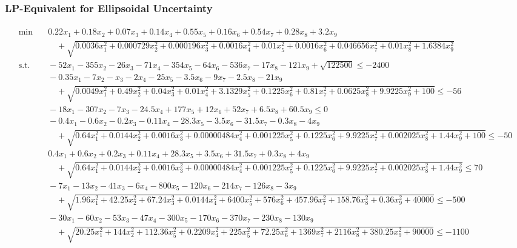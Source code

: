 \documentclass[a4paper,12pt]{article}
\begin{document}
\subsubsection*{LP-Equivalent for Ellipsoidal Uncertainty}
\label{sec:lp-equivalent-ellips}
\begin{adjustwidth}{-1.5cm}{}
\begin{tiny}
\setlength{\jot}{0pt}
\[
\begin{aligned}
   \begin{aligned}
    \min & \quad  0.22x_1 + 0.18x_2 + 0.07x_3 + 0.14x_4 + 0.55x_5 + 0.16x_6 + 0.54x_7 + 0.28x_8 + 3.2x_9 \\
    & \qquad+ \sqrt{0.0036x_1^2+0.000729x_2^2+0.000196x_3^2+0.0016x_4^2+0.01x_5^2+0.0016x_6^2+0.046656x_7^2+0.01x_8^2+1.6384x_9^2} \\
    \text{s.t.}
    & \quad -52x_1-355x_2-26x_3-71x_4-354x_5-64x_6-536x_7-17x_8-121x_9+\sqrt{122500} \leq -2400 \\
    & \quad -0.35x_1 - 7x_2 - x_3 - 2x_4 - 25x_5 - 3.5x_6 - 9x_7 - 2.5x_8 - 21x_9 \\
    & \qquad + \sqrt{0.0049x_1^2 + 0.49x_2^2 + 0.04x_3^2 + 0.01x_4^2 + 3.1329x_5^2 + 0.1225x_6^2 + 0.81x_7^2 + 0.0625x_8^2 + 9.9225x_9^2 + 100} \leq -56 \\
    & \quad -18x_1 - 307x_2 - 7x_3 - 24.5x_4 + 177x_5 + 12x_6 + 52x_7 + 6.5x_8 + 60.5x_9 \leq 0 \\
    & \quad -0.4x_1 - 0.6x_2 - 0.2x_3 - 0.11x_4 - 28.3x_5 - 3.5x_6 - 31.5x_7 - 0.3x_8 - 4x_9 \\
    & \qquad + \sqrt{0.64x_1^2+ 0.0144x_2^2 + 0.0016x_3^2 + 0.00000484x_4^2 + 0.001225x_5^2 + 0.1225x_6^2 + 9.9225x_7^2 + 0.002025x_8^2 + 1.44x_9^2 + 100} \leq -50 \\
    & \quad 0.4x_1 + 0.6x_2 + 0.2x_3 + 0.11x_4 + 28.3x_5 + 3.5x_6 + 31.5x_7 + 0.3x_8 + 4x_9 \\
    & \qquad + \sqrt{0.64x_1^2+ 0.0144x_2^2 + 0.0016x_3^2 + 0.00000484x_4^2 + 0.001225x_5^2 + 0.1225x_6^2 + 9.9225x_7^2 + 0.002025x_8^2 + 1.44x_9^2} \leq 70 \\
    & \quad -7x_1 - 13x_2 - 41x_3 - 6x_4 - 800x_5 - 120x_6 - 214x_7 - 126x_8 - 3x_9 \\
    & \qquad + \sqrt{1.96x_1^2 + 42.25x_2^2 + 67.24x_3^2 + 0.0144x_4^2 + 6400x_5^2 + 576x_6^2 + 457.96x_7^2 + 158.76x_8^2 + 0.36x_9^2 + 40000} \leq -500 \\
    & \quad -30x_1 - 60x_2 - 53x_3 - 47x_4 - 300x_5 -170x_6 - 370x_7 -230x_8 - 130x_9 \\
    & \qquad + \sqrt{20.25x_1^2 + 144x_2^2 + 112.36x_5^2 + 0.2209x_4^2 + 225x_5^2 + 72.25x_6^2 + 1369x_7^2 + 2116x_8^2 + 380.25x_9^2 + 90000} \leq -1100 \\

\end{aligned}
\end{aligned}\]
\end{tiny}
\end{adjustwidth}
\end{document}
